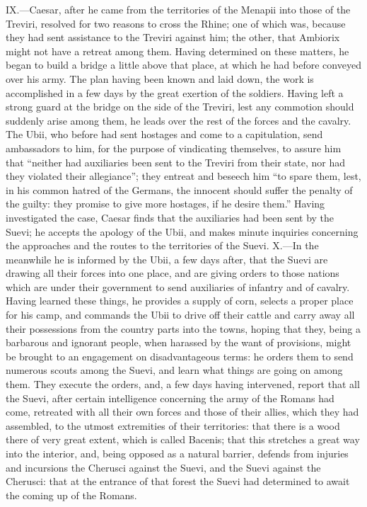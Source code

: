 IX.—Caesar, after he came from the territories of the Menapii into
those of the Treviri, resolved for two reasons to cross the Rhine; one
of which was, because they had sent assistance to the Treviri against
him; the other, that Ambiorix might not have a retreat among them.
Having determined on these matters, he began to build a bridge a little
above that place, at which he had before conveyed over his army. The
plan having been known and laid down, the work is accomplished in a few
days by the great exertion of the soldiers. Having left a strong guard
at the bridge on the side of the Treviri, lest any commotion should
suddenly arise among them, he leads over the rest of the forces and the
cavalry. The Ubii, who before had sent hostages and come to a
capitulation, send ambassadors to him, for the purpose of vindicating
themselves, to assure him that ``neither had auxiliaries been sent to the
Treviri from their state, nor had they violated their allegiance''; they
entreat and beseech him ``to spare them, lest, in his common hatred of
the Germans, the innocent should suffer the penalty of the guilty: they
promise to give more hostages, if he desire them.'' Having investigated
the case, Caesar finds that the auxiliaries had been sent by the Suevi;
he accepts the apology of the Ubii, and makes minute inquiries
concerning the approaches and the routes to the territories of the
Suevi. X.—In the meanwhile he is informed by the Ubii, a few days
after, that the Suevi are drawing all their forces into one place, and
are giving orders to those nations which are under their government to
send auxiliaries of infantry and of cavalry. Having learned these
things, he provides a supply of corn, selects a proper place for his
camp, and commands the Ubii to drive off their cattle and carry away all
their possessions from the country parts into the towns, hoping that
they, being a barbarous and ignorant people, when harassed by the want
of provisions, might be brought to an engagement on disadvantageous
terms: he orders them to send numerous scouts among the Suevi, and learn
what things are going on among them. They execute the orders, and, a few
days having intervened, report that all the Suevi, after certain
intelligence concerning the army of the Romans had come, retreated with
all their own forces and those of their allies, which they had
assembled, to the utmost extremities of their territories: that there is
a wood there of very great extent, which is called Bacenis; that this
stretches a great way into the interior, and, being opposed as a natural
barrier, defends from injuries and incursions the Cherusci against the
Suevi, and the Suevi against the Cherusci: that at the entrance of that
forest the Suevi had determined to await the coming up of the Romans.

